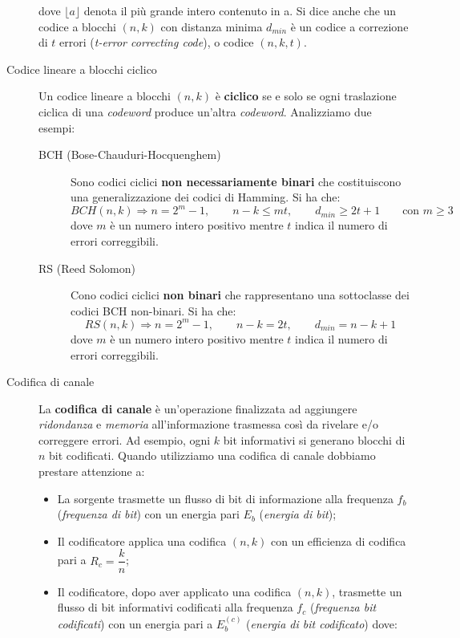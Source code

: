 \documentclass[10pt,a4paper]{article}
\begin{document}
\begin{description}
dove $\lfloor a \rfloor$ denota il più grande intero contenuto in a. Si dice anche che un codice a blocchi $(n,k)$ con distanza minima $d_{min}$ è un codice a correzione di $t$ errori (\textit{t-error correcting code}), o codice $(n,k,t)$.

\item[Codice lineare a blocchi ciclico] Un codice lineare a blocchi $(n,k)$ è \textbf{ciclico} se e solo se ogni traslazione ciclica di una \textit{codeword} produce un'altra \textit{codeword}. Analizziamo due esempi:
\begin{description}
\item[BCH (Bose-Chauduri-Hocquenghem)] Sono codici ciclici \textbf{non necessariamente binari} che costituiscono una generalizzazione dei codici di Hamming. Si ha che:
\begin{equation}
BCH(n,k) \Rightarrow n = 2^m-1, \qquad n-k \leq mt, \qquad d_{min} \geq 2t+1 \qquad \text{con } m \geq 3
\end{equation}
dove $m$ è un numero intero positivo mentre $t$ indica il numero di errori correggibili.

\item[RS (Reed Solomon)] Cono codici ciclici \textbf{non binari} che rappresentano una sottoclasse dei codici BCH non-binari. Si ha che:
\begin{equation}
RS(n,k) \Rightarrow n = 2^m-1, \qquad n-k = 2t, \qquad d_{min} = n-k+1
\end{equation}
dove $m$ è un numero intero positivo mentre $t$ indica il numero di errori correggibili.
\end{description}

\item[Codifica di canale]

La \textbf{codifica di canale} è un'operazione finalizzata ad aggiungere \textit{ridondanza} e \textit{memoria} all'informazione trasmessa così da rivelare e/o correggere errori. Ad esempio, ogni $k$ bit informativi si generano blocchi di $n$ bit codificati. Quando utilizziamo una codifica di canale dobbiamo prestare attenzione a:
\begin{itemize}
\item La sorgente trasmette un flusso di bit di informazione alla frequenza $f_b$ (\textit{frequenza di bit}) con un energia pari $E_b$ (\textit{energia di bit});
\item Il codificatore applica una codifica $(n,k)$ con un efficienza di codifica pari a $R_c=\dfrac{k}{n}$;
\item Il codificatore, dopo aver applicato una codifica $(n,k)$, trasmette un flusso di bit informativi codificati alla frequenza $f_c$ (\textit{frequenza bit codificati}) con un energia pari a $E_b^{(c)}$ (\textit{energia di bit codificato}) dove:


\end{itemize}
\end{description}
\end{document}
